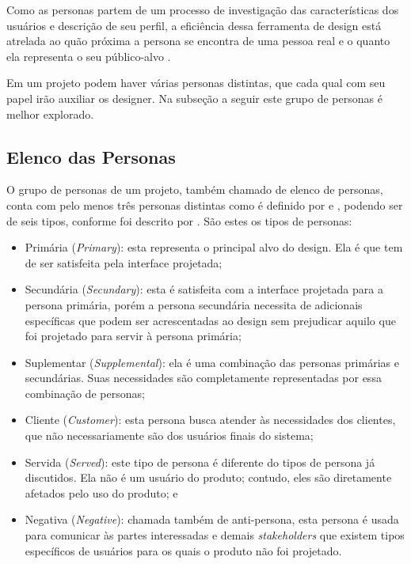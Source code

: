 Como as personas partem de um processo de investigação das características dos usuários e descrição de seu perfil, a eficiência dessa ferramenta de design está atrelada ao quão próxima a persona se encontra de uma pessoa real e o quanto ela representa o seu público-alvo \cite[p. 154]{BarbosaEtAl2021}. 

Em um projeto podem haver várias personas distintas, que cada qual com seu papel irão auxiliar os designer. Na subseção a seguir este grupo de personas é melhor explorado.

\subsection{Elenco das Personas}

O grupo de personas de um projeto, também chamado de elenco de personas, conta com pelo menos três personas distintas como é definido por  e \citeauthor{usability2020}, podendo ser de seis tipos, conforme foi descrito por . São estes os tipos de personas:

\begin{itemize}
    \item Primária (\textit{Primary}): esta representa o principal alvo do design. Ela é que tem de ser satisfeita pela interface projetada;
    
    \item Secundária (\textit{Secundary}): esta é satisfeita com a interface projetada para a persona primária, porém a persona secundária necessita de adicionais específicas que podem ser acrescentadas ao design sem prejudicar aquilo que foi projetado para servir à persona primária;
    
    \item Suplementar (\textit{Supplemental}): ela é uma combinação das personas primárias e secundárias. Suas necessidades são completamente representadas por essa combinação de personas;
    
    \item Cliente (\textit{Customer}): esta persona busca atender às necessidades dos clientes, que não necessariamente são dos usuários finais do sistema;
    
    \item Servida (\textit{Served}): este tipo de persona é diferente do tipos de persona já discutidos. Ela não é um usuário do produto; contudo, eles são diretamente afetados pelo uso do produto; e
    
    \item Negativa (\textit{Negative}): chamada também de anti-persona, esta persona é usada para comunicar às partes interessadas e demais \textit{stakeholders} que existem tipos específicos de usuários para os quais o produto não foi projetado. 
\end{itemize}

